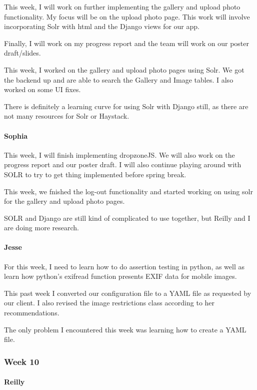 \documentclass[onecolumn, draftclsnofoot,10pt, compsoc]{IEEEtran}
\begin{document}
\begin{flushleft}
This week, I will work on further implementing the gallery and upload photo functionality. My focus will be on the upload photo page. This work will involve incorporating Solr with html and the Django views for our app.
 
Finally, I will work on my progress report and the team will work on our poster draft/slides.
 
 
This week, I worked on the gallery and upload photo pages using Solr. We got the backend up and are able to search the Gallery and Image tables. I also worked on some UI fixes.
 
 
There is definitely a learning curve for using Solr with Django still, as there are not many resources for Solr or Haystack.
 
\paragraph{Sophia}
 
This week, I will finish implementing dropzoneJS. We will also work on the progress report and our poster draft. I will also continue playing around with SOLR to try to get thing implemented before spring break.
 
 
This week, we fnished the log-out functionality and started working on using solr for the gallery and upload photo pages.
 
 
SOLR and Django are still kind of complicated to use together, but Reilly and I are doing more research.
 
\paragraph{Jesse}
 
For this week, I need to learn how to do assertion testing in python, as well as learn how python's exifread function presents EXIF data for mobile images.
 
 
This past week I converted our configuration file to a YAML file as requested by our client. I also revised the image restrictions class according to her recommendations.
 
 
The only problem I encountered this week was learning how to create a YAML file.
 
\subsubsection{Week 10}
\paragraph{Reilly}
 

\end{flushleft}
\end{document}
